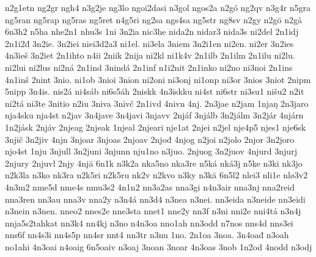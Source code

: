 {    n2g1etn
    ng2gr
    ngh4
    n3g2je
    ng3lo
    ngoi2dasi
    n3gol
    ngos2a
    n2gó
    ng2qv
    n3g4r
    n5gra
    ng5ran
    ng5rap
    ng5ras
    ng5ret
    n4g5ri
    ng2sa
    ngs4sa
    ng5str
    ng8sv
    n2gy
    n2gö
    n2gå
    6n3h2
    n5ha
    nhe2n1
    nhu3s
    1ni
    3n2ia
    nic3he
    nida2n
    nidar3
    nida3s
    ni2del
    2n1idj
    2n1i2đ
    3n2ie.
    3n2iei
    niei3d2a3
    ni1el.
    ni3ela
    3niem
    3n2i1en
    ni2en.
    ni2er
    3n2ies
    4n3ieš
    3n2iet
    2n1ihto
    n4ii
    2niik
    2nija
    ni2kl
    ni1k4v
    2n1ilb
    2n1ilm
    2n1ilu
    ni2lu.
    ni2lui
    ni2lus
    ni2ná
    2n1ind
    3nindá
    2n1inf
    n1i2nit
    2n1inko
    ni2no
    ni3noi
    2n1ins
    4n1inš
    2nint
    3nio.
    ni1ob
    3nioi
    3nion
    ni2oni
    ni3onj
    ni1onp
    ni3or
    3nios
    3niot
    2nipm
    5nipp
    3n4is.
    nis2á
    ni4sáb
    ni6s5áh
    2niskk
    4n3iskku
    ni4st
    ni6str
    ni3su1
    nišu2
    n2it
    ni2tá
    ni3te
    3nitio
    n2iu
    3niva
    3nivč
    2n1ivd
    4nivn
    4nj.
    2n3jae
    n2jam
    1njaŋ
    2n3jaro
    nja4sku
    nja4st
    n2jav
    3n4jave
    3n4javi
    3njavv
    2njáf
    3njálb
    3n2jálm
    3n2jár
    4njárn
    1n2jásk
    2njáv
    2njeag
    2njeak
    1njeal
    2njeari
    nje1at
    2njei
    n2jel
    nje4p5
    njes1
    nje6sk
    3njič
    3n2jiv
    4njn
    3njoar
    3njoas
    2njoav
    2njođ
    4njog
    n2joi
    n2jolo
    2njor
    3n2joro
    njo4st
    1nju
    3njull
    3n2juni
    3njunn
    nju1no
    n3juo.
    2njuog
    3n2juov
    4njurd
    3njurj
    2njury
    2njuvl
    2njy
    4njä
    6n1k
    n3k2a
    nka5no
    nka3re
    n5ká
    nká3j
    n5ke
    n3ki
    nk3jo
    n2k3la
    n3ko
    nk3ra
    n2k5ri
    n2k5ru
    nk2v
    n2kvo
    n3ky
    n3kä
    6n5l2
    nlei3
    nli1e
    nlø3v2
    4n3m2
    nme5d
    nme4s
    nmu3s2
    4n1n2
    nn3a2as
    nna3gi
    n4n3air
    nna3nj
    nna2reid
    nna3ren
    nn3au
    nna3v
    nna2y
    n3n4á
    nn3d4
    n3nea
    n3nei.
    nn3eida
    n3neide
    nn3eidi
    n3nein
    n3nen.
    nneo2
    nnes2e
    nne3sta
    nnet1
    nne2y
    nn3f
    n3ni
    nni2e
    nni4tá
    n3n4j
    nnja5s2tahkat
    nn3k4
    nn4kj
    n3no
    n4n3oa
    nno1ah
    nn3odd
    n7nos
    nns4d
    nns3ei
    nns6f
    nn4s3i
    nn4s5p
    nn4sr
    nnt4
    nn3tr
    n3nu
    1no.
    2n1oa
    3noa.
    3n4oađ
    n3oah
    no1ahi
    4n3oai
    n4oaig
    6n5oaiv
    n3oaj
    3noan
    3noar
    4n3oas
    3nob
    1n2od
    4nodd
    n3odj
}
